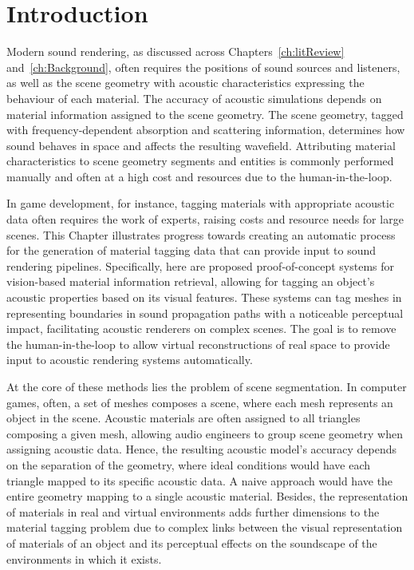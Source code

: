 \section{Introduction}
Modern sound rendering, as discussed across Chapters~\ref{ch:litReview} and~\ref{ch:Background}, often requires the positions of sound sources and listeners, as well as the scene geometry with acoustic characteristics expressing the behaviour of each material. The accuracy of acoustic simulations depends on material information assigned to the scene geometry. The scene geometry, tagged with frequency-dependent absorption and scattering information, determines how sound behaves in space and affects the resulting wavefield. Attributing material characteristics to scene geometry segments and entities is commonly performed manually and often at a high cost and resources due to the human-in-the-loop.\par
In game development, for instance, tagging materials with appropriate acoustic data often requires the work of experts, raising costs and resource needs for large scenes. This Chapter illustrates progress towards creating an automatic process for the generation of material tagging data that can provide input to sound rendering pipelines. Specifically, here are proposed proof-of-concept systems for vision-based material information retrieval, allowing for tagging an object's acoustic properties based on its visual features. These systems can tag meshes in  representing boundaries in sound propagation paths with a noticeable perceptual impact, facilitating acoustic renderers on complex scenes. The goal is to remove the human-in-the-loop to allow virtual reconstructions of real space to provide input to acoustic rendering systems automatically.\par
At the core of these methods lies the problem of scene segmentation. In computer games, often, a set of meshes composes a scene, where each mesh represents an object in the scene. Acoustic materials are often assigned to all triangles composing a given mesh, allowing audio engineers to group scene geometry when assigning acoustic data. Hence, the resulting acoustic model's accuracy depends on the separation of the geometry, where ideal conditions would have each triangle mapped to its specific acoustic data. A naive approach would have the entire geometry mapping to a single acoustic material. Besides, the representation of materials in real and virtual environments adds further dimensions to the material tagging problem due to complex links between the visual representation of materials of an object and its perceptual effects on the soundscape of the environments in which it exists.\par
